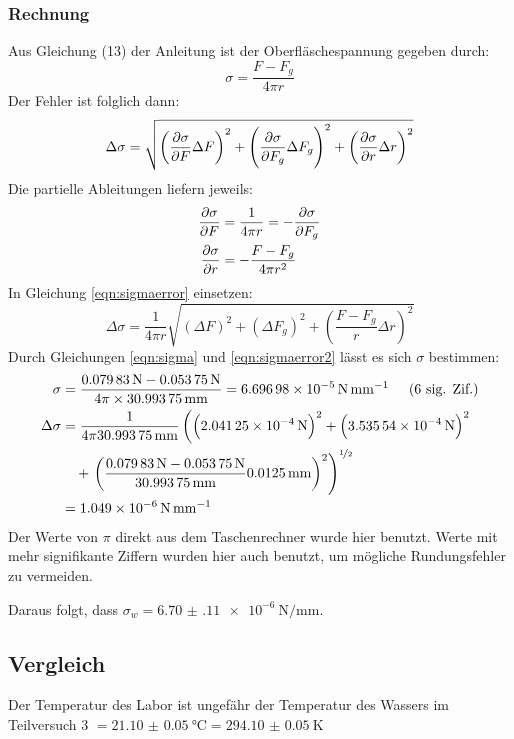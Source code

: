 		\subsubsection{Rechnung}
			Aus Gleichung (13) der Anleitung ist der Oberfläschespannung gegeben durch:
			\begin{equation}
				\sigma = \frac{F - F_g}{4\pi r} \label{eqn:sigma}
			\end{equation}
			Der Fehler ist folglich dann:
			\begin{equation}
				\Delta \sigma = \gausserror{\sigma}{F, F_g, r} \label{eqn:sigmaerror}
			\end{equation}
			Die partielle Ableitungen liefern jeweils:
			\begin{align*}
				\pdv{\sigma}{F} &= \frac{1}{4\pi r} = -\pdv{\sigma}{F_g} \\
				\pdv{\sigma}{r} &= -\frac{F-F_g}{4\pi r^2}
			\end{align*}
			In Gleichung \eqref{eqn:sigmaerror} einsetzen: 
			\begin{equation}
				\Delta \sigma = \frac{1}{4\pi r}\sqrt{\left(\Delta F\right)^2 + \left(\Delta F_g\right)^2 + \left(\frac{F - F_g}{r}\Delta r\right)^2} \label{eqn:sigmaerror2}
			\end{equation}
			Durch Gleichungen \eqref{eqn:sigma} und \eqref{eqn:sigmaerror2} lässt es sich $\sigma$ bestimmen:
			\begin{align}
				\sigma &= \frac{\SI{0.07983}{\newton} - \SI{0.05375}{\newton}}{4\pi \times \SI{30,99375}{\milli\meter}} = \SI{6.69698e-5}{\newton\per\milli\meter} \hspace{0.5cm}\text{(6 sig. Zif.)} \\
				\Delta \sigma &= \frac{1}{4\pi \SI{30,99375}{\milli\meter}}\left(\left(\SI{2,04125e-4}{\newton}\right)^2 + \left(\SI{3.53554e-4}{\newton}\right)^2 \right. \notag \\
				&~~~+ \left. \left(\frac{\SI{0.07983}{\newton} - \SI{0.05375}{\newton}}{\SI{30,99375}{\milli\meter}}\SI{0.0125}{\milli\meter}\right)^2 \right)^{\nicefrac{1}{2}} \notag \\
				&= \SI{1.049e-6}{\newton\per\milli\meter}
			\end{align}
			Der Werte von $\pi$ direkt aus dem Taschenrechner wurde hier benutzt. Werte mit mehr signifikante Ziffern wurden hier auch benutzt, um mögliche Rundungsfehler zu vermeiden.

			Daraus folgt, dass $\sigma_w = \SI{6.70(11)e-6}{\newton\per\milli\meter}$.

		\subsection{Vergleich}
			Der Temperatur des Labor ist ungefähr der Temperatur des Wassers im Teilversuch 3 $= \SI{21.10(5)}{\celsius} = \SI{294.10(5)}{\kelvin}$

